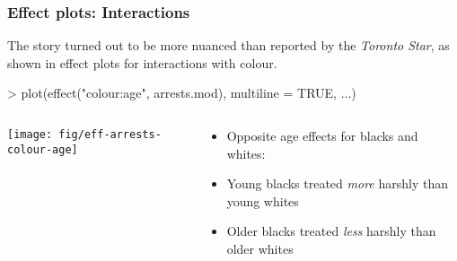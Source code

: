 \begin{frame}[fragile]
	\frametitle{Effect plots: Interactions}
	The story turned out to be more nuanced than reported by the \emph{Toronto Star},
	as shown in effect plots for interactions with colour.

\begin{Schunk}
\begin{Sinput}
> plot(effect("colour:age", arrests.mod), multiline = TRUE, ...)
\end{Sinput}
\end{Schunk}
\begin{columns}
\begin{column}{0.55\textwidth}
\texttt{[image: fig/eff-arrests-colour-age]}
\end{column}
\begin{column}{0.45\textwidth}
	\begin{small}
	\begin{itemize}
	 \item Opposite age effects for blacks and whites:
	 \item Young blacks treated \emph{more} harshly than young whites
	 \item Older blacks treated \emph{less} harshly than older whites
	\end{itemize}
\end{small}
\end{column}
\end{columns}
\end{frame}

